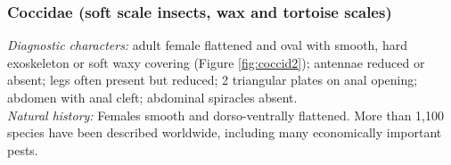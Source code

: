 \documentclass[letterpaper, 11pt]{article}
\begin{document}
\subsubsection{Coccidae (soft scale insects, wax and tortoise scales)}
\noindent{}\textit{Diagnostic characters:} adult female flattened and oval with smooth, hard exoskeleton or soft waxy covering (Figure \ref{fig:coccid2}); antennae reduced or absent; legs often present but reduced; 2 triangular plates on anal opening; abdomen with anal cleft; abdominal spiracles absent.\\

\noindent{}\textit{Natural history:} Females smooth and dorso-ventrally flattened. More than 1,100 species have been described worldwide, including many economically important pests.\\
\end{document}
